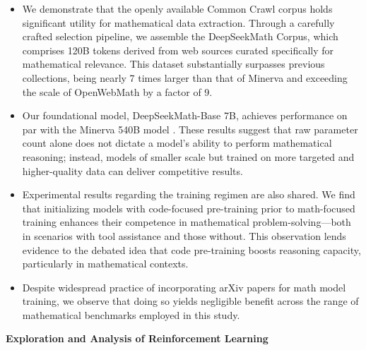 \begin{itemize}[topsep=0pt]
    \item We demonstrate that the openly available Common Crawl corpus holds significant utility for mathematical data extraction. Through a carefully crafted selection pipeline, we assemble the DeepSeekMath Corpus, which comprises 120B tokens derived from web sources curated specifically for mathematical relevance. This dataset substantially surpasses previous collections, being nearly 7 times larger than that of Minerva \citep{minerva} and exceeding the scale of OpenWebMath \citep{openwebmath} by a factor of 9.

    \item Our foundational model, DeepSeekMath-Base 7B, achieves performance on par with the Minerva 540B model \citep{minerva}. These results suggest that raw parameter count alone does not dictate a model’s ability to perform mathematical reasoning; instead, models of smaller scale but trained on more targeted and higher-quality data can deliver competitive results.

    \item Experimental results regarding the training regimen are also shared. We find that initializing models with code-focused pre-training prior to math-focused training enhances their competence in mathematical problem-solving—both in scenarios with tool assistance and those without. This observation lends evidence to the debated idea that code pre-training boosts reasoning capacity, particularly in mathematical contexts.

    \item Despite widespread practice of incorporating arXiv papers for math model training, we observe that doing so yields negligible benefit across the range of mathematical benchmarks employed in this study.
\end{itemize}

\textbf{Exploration and Analysis of Reinforcement Learning}

